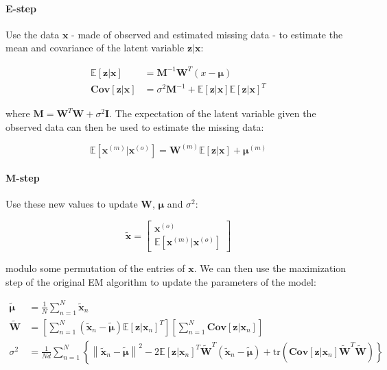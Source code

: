 \documentclass{article}
\newcommand{\E}{\mathbb{E}}
\begin{document}
\paragraph{E-step} Use the data $\mathbf{x}$ - made of observed and estimated missing data - to estimate the mean and covariance of the latent variable $\mathbf{z}|\mathbf{x}$:

\begin{align}
    \label{eq:ppca_e_step_E}
    \E[\mathbf{z}|\mathbf{x}] &= \mathbf{M}^{-1}\mathbf{W}^{T}\left(x - \boldsymbol{\mu}\right) \\
    \label{eq:ppca_e_step_Cov}
    \mathbf{Cov}[\mathbf{z}|\mathbf{x}] &= \sigma^2\mathbf{M}^{-1} + \E[\mathbf{z}|\mathbf{x}]\E[\mathbf{z}|\mathbf{x}]^T
\end{align}
    
    where $\mathbf{M} = \mathbf{W}^{T}\mathbf{W} + \sigma^2\mathbf{I}$. The expectation of the latent variable given the observed data can then be used to estimate the missing data:

\begin{equation}
    \label{eq:ppca_e_step_completion}
    \E[\mathbf{x}^{(m)}|\mathbf{x}^{(o)}] = \mathbf{W}^{(m)}\E[\mathbf{z}|\mathbf{x}] + \boldsymbol{\mu}^{(m)}
\end{equation}

\paragraph{M-step} Use these new values to update $\mathbf{W}$, $\boldsymbol{\mu}$ and $\sigma^2$:

\begin{equation}
    \label{eq:ppca_m_step}
    \widetilde{\mathbf{x}} = \left[
        \begin{array}{c}
            \mathbf{x}^{(o)} \\
            \E[\mathbf{x}^{(m)}|\mathbf{x}^{(o)}]
        \end{array}       
    \right]
\end{equation}

modulo some permutation of the entries of $\mathbf{x}$. We can then use the maximization step of the original EM algorithm to update the parameters of the model:

\begin{align}
    \label{eq:ppca_mu}
    \widetilde{\boldsymbol{\mu}} &= \frac{1}{N}\sum_{n=1}^N \widetilde{\mathbf{x}}_n \\
    \label{eq:ppca_W}
    \widetilde{\mathbf{W}} &= \left[
        \sum_{n=1}^N \left(\widetilde{\mathbf{x}}_n - \widetilde{\boldsymbol{\mu}}\right) \E[\mathbf{z}|\mathbf{x}_n]^T
    \right] \left[
        \sum_{n=1}^N \mathbf{Cov}[\mathbf{z}|\mathbf{x}_n]
    \right] \\
    \label{eq:ppca_sigma}
    \sigma^2 &= \frac{1}{Nd}\sum_{n=1}^N \left\{
        \left\| \widetilde{\mathbf{x}}_n - \widetilde{\boldsymbol{\mu}}\right\|^2 - 2\E[\mathbf{z}|\mathbf{x}_n]^T\widetilde{\mathbf{W}}^T\left(\widetilde{\mathbf{x}}_n - \widetilde{\boldsymbol{\mu}}\right) + \text{tr}\left(\mathbf{Cov}[\mathbf{z}|\mathbf{x}_n]\widetilde{\mathbf{W}}^T\widetilde{\mathbf{W}}\right)
    \right\}
\end{align}
\end{document}
